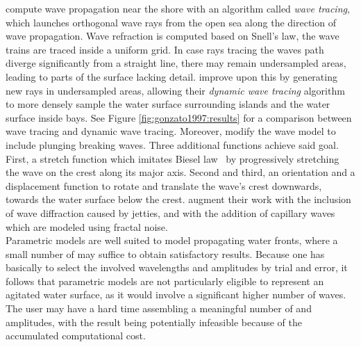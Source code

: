 \cite{Ts'o:1987} compute wave propagation near the shore with an algorithm
called \emph{wave tracing}, which launches orthogonal wave rays from the open
sea along the direction of wave propagation. Wave refraction is computed based
on Snell's law, the wave trains are traced inside a uniform grid.
In case rays tracing the waves path diverge
significantly from a straight line, there may remain undersampled areas,
leading to parts of the surface lacking detail. \cite{Gonzato:1997} improve
upon this by generating new rays in undersampled areas, allowing their
\emph{dynamic wave tracing} algorithm to more densely sample the water surface
surrounding islands and the water surface inside bays. See Figure
\ref{fig:gonzato1997:results} for a comparison between wave tracing and
dynamic wave tracing. Moreover,
\citeauthor{Gonzato:1997} modify the wave model to include plunging breaking
waves. Three additional functions achieve said goal.
First, a stretch function which imitates Biesel law~\citep{Biesel:1952} by
progressively stretching the wave on the crest along its major axis. Second and
third, an orientation and a displacement function to rotate and translate
the wave's crest downwards, towards the water surface below the crest.
\cite{Gonzato:2000} augment their work with the inclusion of wave diffraction
caused by jetties, and with the addition of capillary waves which are modeled
using fractal noise.\\

Parametric models are well suited to model propagating water fronts, where a
small number of \wavenumbers may suffice to obtain satisfactory results.
Because one has basically to select the involved wavelengths and amplitudes
by trial and error, it follows that parametric models are not particularly
eligible to represent an agitated water surface, as it would involve a
significant higher number of waves. The user may have a hard time assembling a
meaningful number of \wavenumbers and amplitudes, with the result being
potentially infeasible because of the accumulated computational cost.
%
%
